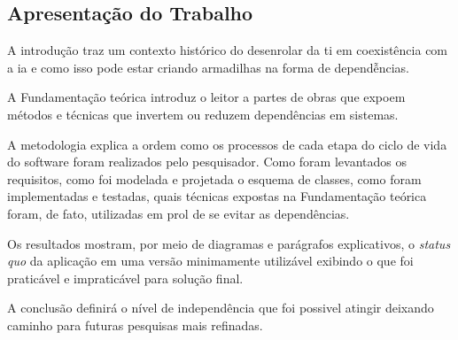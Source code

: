 

\subsection{\textbf{Apresentação do Trabalho}}
    \label{sec:apresentacao-trabalho}
    
    A introdução traz um contexto histórico do desenrolar da \ac{ti}
    em coexistência com a \ac{ia} e como isso pode estar criando armadilhas
    na forma de dependễncias.

    A Fundamentação teórica introduz o leitor a partes de obras que expoem
    métodos e técnicas que invertem ou reduzem dependências em
    sistemas.

    A metodologia explica a ordem como os processos de cada
    etapa do ciclo de vida do software foram realizados pelo
    pesquisador. Como foram levantados os requisitos, como foi
    modelada e projetada o esquema de classes, como foram implementadas
    e testadas, quais técnicas expostas na Fundamentação teórica foram, de fato,
    utilizadas em prol de se evitar as dependências.

    Os resultados mostram, por meio de diagramas e parágrafos explicativos,
    o \textit{status quo} da aplicação em uma versão minimamente utilizável
    exibindo o que foi praticável e impraticável para solução final.

    A conclusão definirá o nível de independência que foi possivel atingir
    deixando caminho para futuras pesquisas mais refinadas.

